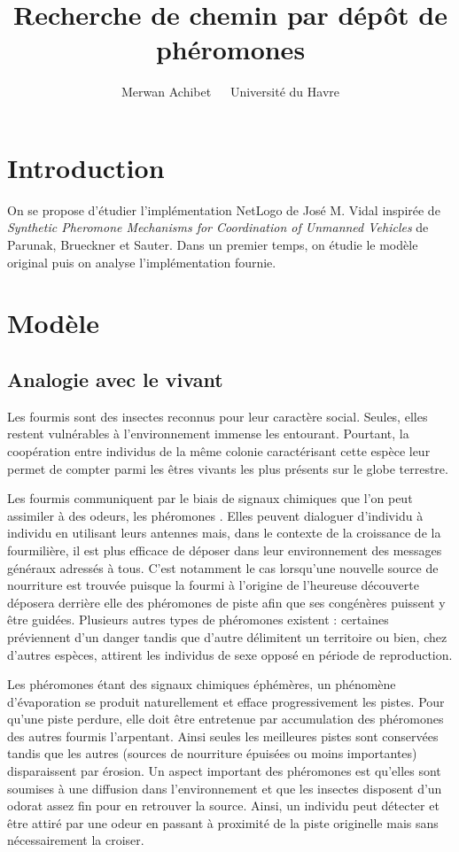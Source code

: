 \documentclass[12pt]{article}
\title{Recherche de chemin par dépôt de phéromones}
\author{Merwan Achibet $\;$ \textendash $\;$ Université du Havre}
\date{}
\begin{document}
\maketitle

\section*{Introduction}

On se propose d'étudier l'implémentation NetLogo de José M. Vidal
inspirée de \textit{Synthetic Pheromone Mechanisms for Coordination of
  Unmanned Vehicles} de Parunak, Brueckner et Sauter. Dans un premier
temps, on étudie le modèle original puis on analyse l'implémentation
fournie.

\section{Modèle}

\subsection{Analogie avec le vivant}

Les fourmis sont des insectes reconnus pour leur caractère
social. Seules, elles restent vulnérables à l'environnement immense
les entourant. Pourtant, la coopération entre individus de la même
colonie caractérisant cette espèce leur permet de compter parmi les
êtres vivants les plus présents sur le globe terrestre.

Les fourmis communiquent par le biais de signaux chimiques que l'on
peut assimiler à des odeurs, les phéromones \cite{insectes}. Elles
peuvent dialoguer d'individu à individu en utilisant leurs antennes
mais, dans le contexte de la croissance de la fourmilière, il est plus
efficace de déposer dans leur environnement des messages généraux
adressés à tous. C'est notamment le cas lorsqu'une nouvelle source de
nourriture est trouvée puisque la fourmi à l'origine de l'heureuse
découverte déposera derrière elle des phéromones de piste afin que ses
congénères puissent y être guidées. Plusieurs autres types de
phéromones existent : certaines préviennent d'un danger tandis que
d'autre délimitent un territoire ou bien, chez d'autres espèces,
attirent les individus de sexe opposé en période de reproduction.

Les phéromones étant des signaux chimiques éphémères, un phénomène
d'évaporation se produit naturellement et efface progressivement les
pistes.  Pour qu'une piste perdure, elle doit être entretenue par
accumulation des phéromones des autres fourmis l'arpentant. Ainsi
seules les meilleures pistes sont conservées tandis que les autres
(sources de nourriture épuisées ou moins importantes) disparaissent
par érosion.  Un aspect important des phéromones est qu'elles sont
soumises à une diffusion dans l'environnement et que les insectes
disposent d'un odorat assez fin pour en retrouver la source. Ainsi, un
individu peut détecter et être attiré par une odeur en passant à
proximité de la piste originelle mais sans nécessairement la croiser.
\end{document}
